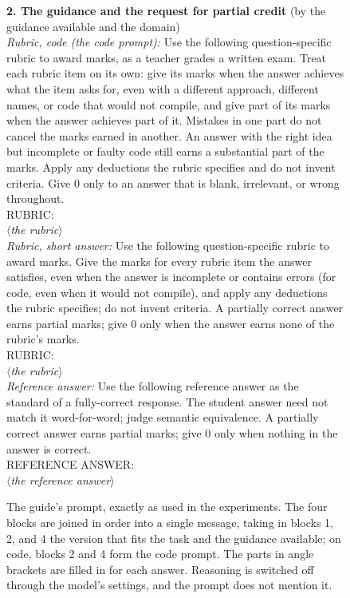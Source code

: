 \begin{figure}[!tb]
{\begin{minipage}{0.975\textwidth}
\begin{minipage}[t]{0.485\textwidth}
\textbf{2. The guidance and the request for partial credit} (by the guidance available and the domain)\\[2pt]
\emph{Rubric, code (the code prompt):} Use the following question-specific rubric to award marks, as a teacher grades a written
exam. Treat each rubric item on its own: give its marks when the answer achieves what the item asks for, even with
a different approach, different names, or code that would not compile, and give part of its marks when the answer
achieves part of it. Mistakes in one part do not cancel the marks earned in another. An answer with the right idea
but incomplete or faulty code still earns a substantial part of the marks. Apply any deductions the rubric
specifies and do not invent criteria. Give 0 only to an answer that is blank, irrelevant, or wrong throughout.\\
RUBRIC:\\ $\langle$\emph{the rubric}$\rangle$\\[3pt]
\emph{Rubric, short answer:} Use the following question-specific rubric to award marks. Give the marks for every rubric
item the answer satisfies, even when the answer is incomplete or contains errors (for code, even when it
would not compile), and apply any deductions the rubric specifies; do not invent criteria. A partially
correct answer earns partial marks; give 0 only when the answer earns none of the rubric's marks.\\
RUBRIC:\\ $\langle$\emph{the rubric}$\rangle$\\[3pt]
\emph{Reference answer:} Use the following reference answer as the standard of a fully-correct response.
The student answer need not match it word-for-word; judge semantic equivalence. A partially correct
answer earns partial marks; give 0 only when nothing in the answer is correct.\\
REFERENCE ANSWER:\\ $\langle$\emph{the reference answer}$\rangle$
\end{minipage}
\end{minipage}}
\caption{The guide's prompt, exactly as used in the experiments. The four blocks are joined in order into a
single message, taking in blocks 1, 2, and 4 the version that fits the task and the guidance available; on code,
blocks 2 and 4 form the code prompt. The parts in angle brackets are filled in for each answer. Reasoning is
switched off through the model's settings, and the prompt does not mention it.}
\label{fig:guideprompt}
\end{figure}

